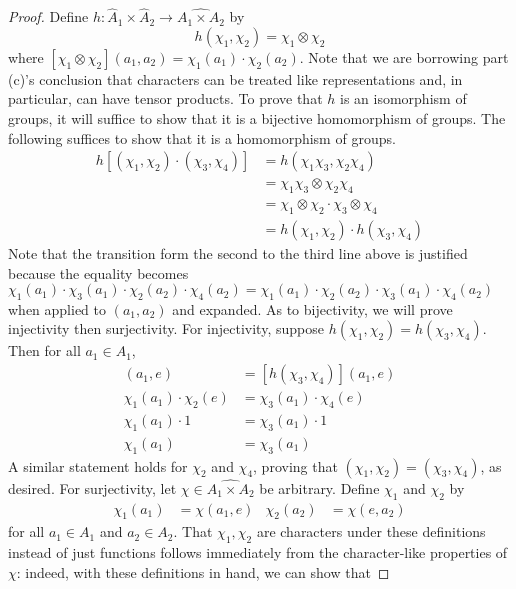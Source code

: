 \documentclass[../psets.tex]{subfiles}
\begin{document}
\begin{enumerate}
\begin{enumerate}
\begin{proof}
            Define $h:\widehat{A}_1\times\widehat{A}_2\to\widehat{A_1\times A_2}$ by
            \begin{equation*}
                h(\chi_1,\chi_2) = \chi_1\otimes\chi_2
            \end{equation*}
            where $[\chi_1\otimes\chi_2](a_1,a_2)=\chi_1(a_1)\cdot\chi_2(a_2)$. Note that we are borrowing part (c)'s conclusion that characters can be treated like representations and, in particular, can have tensor products. To prove that $h$ is an isomorphism of groups, it will suffice to show that it is a bijective homomorphism of groups. The following suffices to show that it is a homomorphism of groups.
            \begin{align*}
                h[(\chi_1,\chi_2)\cdot(\chi_3,\chi_4)] &= h(\chi_1\chi_3,\chi_2\chi_4)\\
                &= \chi_1\chi_3\otimes\chi_2\chi_4\\
                &= \chi_1\otimes\chi_2\cdot\chi_3\otimes\chi_4\\
                &= h(\chi_1,\chi_2)\cdot h(\chi_3,\chi_4)
            \end{align*}
            Note that the transition form the second to the third line above is justified because the equality becomes $\chi_1(a_1)\cdot\chi_3(a_1)\cdot\chi_2(a_2)\cdot\chi_4(a_2)=\chi_1(a_1)\cdot\chi_2(a_2)\cdot\chi_3(a_1)\cdot\chi_4(a_2)$ when applied to $(a_1,a_2)$ and expanded. As to bijectivity, we will prove injectivity then surjectivity. For injectivity, suppose $h(\chi_1,\chi_2)=h(\chi_3,\chi_4)$. Then for all $a_1\in A_1$,
            \begin{align*}
                [h(\chi_1,\chi_2)](a_1,e) &= [h(\chi_3,\chi_4)](a_1,e)\\
                \chi_1(a_1)\cdot\chi_2(e) &= \chi_3(a_1)\cdot\chi_4(e)\\
                \chi_1(a_1)\cdot 1 &= \chi_3(a_1)\cdot 1\\
                \chi_1(a_1) &= \chi_3(a_1)
            \end{align*}
            A similar statement holds for $\chi_2$ and $\chi_4$, proving that $(\chi_1,\chi_2)=(\chi_3,\chi_4)$, as desired. For surjectivity, let $\chi\in\widehat{A_1\times A_2}$ be arbitrary. Define $\chi_1$ and $\chi_2$ by
            \begin{align*}
                \chi_1(a_1) &= \chi(a_1,e)&
                \chi_2(a_2) &= \chi(e,a_2)
            \end{align*}
            for all $a_1\in A_1$ and $a_2\in A_2$. That $\chi_1,\chi_2$ are characters under these definitions instead of just functions follows immediately from the character-like properties of $\chi$: indeed, with these definitions in hand, we can show that

\end{proof}
\end{enumerate}
\end{enumerate}
\end{document}
